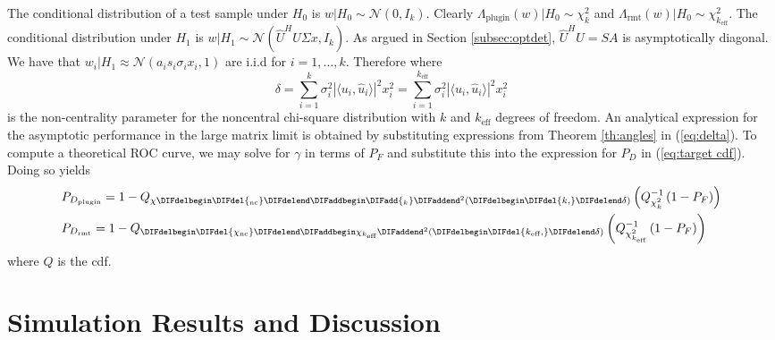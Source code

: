 The conditional distribution of a test sample under $H_0$ is $w|H_0\sim\mathcal{N}(0,I_k)$. Clearly $\Lambda_\text{plugin}(w)|H_0\sim\chi_k^2$ and $\Lambda_\text{rmt}(w)|H_0\sim\chi_{k_\text{eff}}^2$. The conditional distribution under $H_1$ is $w|H_1\sim\mathcal{N}(\widehat{U}^HU\Sigma x,I_k)$. As argued in Section \ref{subsec:optdet}, $\widehat{U}^HU=SA$ is asymptotically diagonal. We have that $w_i|H_1\approx\mathcal{N}(a_is_i\sigma_ix_i,1)$ are i.i.d for $i=1,\dots,k$. Therefore \DIFdelbegin {}\DIFdelend \DIFaddbegin {}\DIFaddend where
\begin{equation}\label{eq:delta}
\delta=\sum_{i=1}^k\sigma_i^2|\langle u_i,\widehat{u}_i\rangle|^2x_i^2=\sum_{i=1}^{k_\text{eff}}\sigma_i^2|\langle u_i,\widehat{u}_i\rangle|^2x_i^2
 \end{equation}
is the non-centrality parameter for the noncentral chi-square distribution with $k$ and $k_\text{eff}$ degrees of freedom. An analytical expression for the asymptotic performance in the large matrix limit  is obtained by substituting expressions from Theorem \ref{th:angles} in (\ref{eq:delta}). To compute a theoretical ROC curve, we may solve for $\gamma$ in terms of $P_F$ and substitute this into the expression for $P_D$  in (\ref{eq:target cdf}). Doing so yields
\begin{equation}\label{eq:roc}
\begin{aligned}
&P_{D_\text{plugin}}=1-Q_{\chi\DIFdelbegin \DIFdel{_\text{nc}}\DIFdelend \DIFaddbegin \DIFadd{_k}\DIFaddend ^2(\DIFdelbegin \DIFdel{k,}\DIFdelend \delta)}\left(Q^{-1}_{\chi^2_k}\left(1-P_F\right)\right)\\
&P_{D_\text{rmt}}=1-Q_{\DIFdelbegin \DIFdel{\chi_\text{nc}}\DIFdelend \DIFaddbegin \chi_{k_\text{eff}}\DIFaddend ^2(\DIFdelbegin \DIFdel{k_\text{eff},}\DIFdelend \delta)}\left(Q^{-1}_{\chi^2_{k_\text{eff}}}\left(1-P_F\right)\right)
\end{aligned}
\end{equation}
where $Q$ is the cdf.

\section{Simulation Results and Discussion}\label{sec:results}

